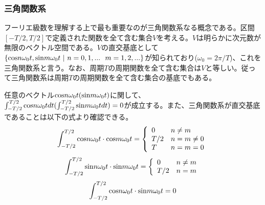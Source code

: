 \documentclass[dvipdfmx, 9pt, a4paper]{jsarticle}
\begin{document}
\subsubsection{三角関数系}
フーリエ級数を理解する上で最も重要なのが三角関数系なる概念である。区間$[-T/2, T/2]$で定義された関数を全て含む集合$V$を考える。$V$は明らかに次元数が無限のベクトル空間である。$V$の直交基底として$\{{\rm cos}n\omega_0t, {\rm sin}m\omega_0t~|~n=0,1,...~~m=1,2,...\}$が知られており($\omega_0=2\pi/T$)、これを三角関数系と言う。なお、周期$T$の周期関数を全て含む集合は$V$と等しい。従って三角関数系は周期$T$の周期関数を全て含む集合の基底でもある。\par
任意のベクトル${\rm cos}n\omega_0t({\rm sin}m\omega_0t)$に関して、$\int_{-T/2}^{T/2}{\rm cos}n\omega_0tdt(\int_{-T/2}^{T/2}{\rm sin}m\omega_0tdt)=0$が成立する。また、三角関数系が直交基底であることは以下の式より確認できる。
\begin{equation}
\int_{-T/2}^{T/2}{\rm cos}n\omega_0t \cdot {\rm cos}m\omega_0t=
\left\{
\begin{array}{ll}
0 & n \neq m \\
T/2 & n=m \neq 0 \\
T & n=m=0
\end{array}\right. \notag
\end{equation}
\begin{equation}
\int_{-T/2}^{T/2}{\rm sin}n\omega_0t \cdot {\rm sin}m\omega_0t=
\left\{
\begin{array}{ll}
0 & n \neq m \\
T/2 & n=m \\
\end{array}\right. \notag
\end{equation}
\begin{equation}
\int_{-T/2}^{T/2}{\rm cos}n\omega_0t \cdot {\rm sin}m\omega_0t=0 \notag
\end{equation}
\end{document}
